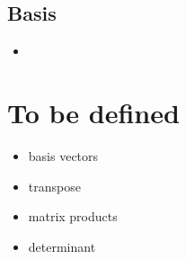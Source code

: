 \begin{itemize}
  \subsection{Basis}\label{Basis}
  \begin{itemize}
    \item 
  \end{itemize}
  
\end{itemize}

  
\newpage

\section{To be defined}\label{tbd}
\begin{itemize}
  \item basis vectors
  \item transpose
  \item matrix products
  \item determinant
\end{itemize}





